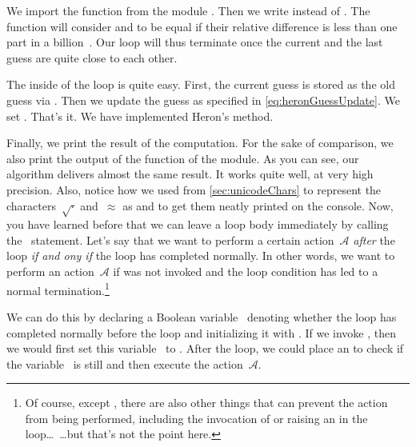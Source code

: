 We import the function  from the module .
Then we write  instead of .
The function  will consider  and  to be equal if their relative difference is less than one part in a billion~\cite{PEP485}.
Our loop will thus terminate once the current and the last guess are quite close to each other.%
%
\begin{sloppypar}%
The inside of the loop is quite easy.
First, the current guess is stored as the old guess via .
Then we update the guess as specified in \cref{eq:heronGuessUpdate}.
We set .
That's it.
We have implemented Heron's method.%
\end{sloppypar}%
%
Finally, we print the result of the computation.
For the sake of comparison, we also print the output of the  function of the  module.
As you can see, our algorithm delivers almost the same result.
It works quite well, at very high precision.
Also, notice how we used   from \cref{sec:unicodeChars} to represent the characters~$\sqrt{\cdot}$ and~$\approx$ as  and  to get them neatly printed on the console.%
%
\FloatBarrier%
\endhsection%
%
%
%
\label{sec:loopElse}%
%
Now, you have learned before that we can leave a loop body immediately by calling the~ statement.
Let's say that we want to perform a certain action~$\mathcal{A}$ \emph{after} the loop \emph{if and ony if} the loop has completed normally.
In other words, we want to perform an action~$\mathcal{A}$ if  was not invoked and the loop condition has led to a normal termination.\footnote{%
Of course, except , there are also other things that can prevent the action from being performed, including the invocation of  or raising an  in the loop\dots\ {\dots}but that's not the point here.%
}

We can do this by declaring a Boolean variable~ denoting whether the loop has completed normally before the loop and initializing it with .
If we invoke , then we would first set this variable~ to .
After the loop, we could place an  to check if the variable~ is still  and then execute the action~$\mathcal{A}$.

